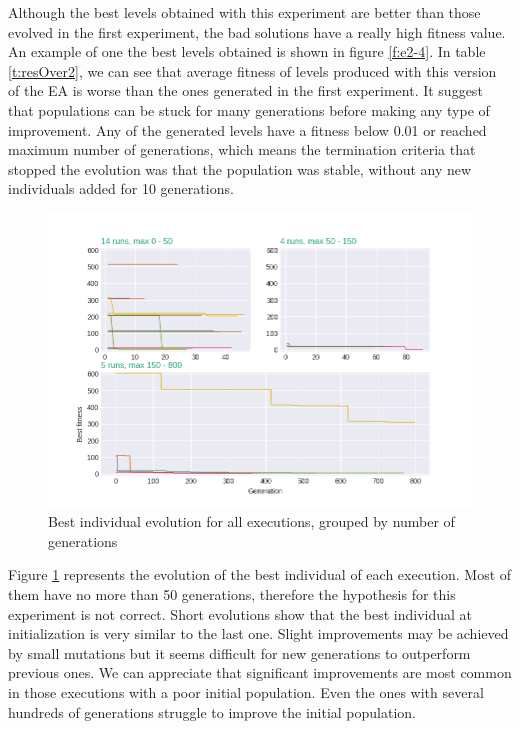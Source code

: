 \documentclass[sigconf]{acmart}
\begin{document}
Although the best levels obtained with this experiment are better than those 
evolved in the first experiment, the bad solutions have a really high fitness 
value. An example of one the best levels obtained is shown in figure 
\ref{f:e2-4}.
In table \ref{t:resOver2}, we can see that average fitness of levels 
produced with this version of the EA is worse than the ones generated in the 
first experiment. It suggest that populations can be stuck for many generations 
before making any type of improvement. Any of the generated levels have a 
fitness below 0.01 or reached maximum number of generations, which means the 
termination criteria that stopped the evolution was that the population was 
stable, without any new individuals added for 10 generations.
\begin{figure}[H]
	\centering
	\includegraphics[scale=0.4]{exp2_explication.png}
	\caption{Best individual evolution for all executions, grouped by number of 
	generations}\label{f:grahp2}
\end{figure}
Figure \ref{f:grahp2} represents the evolution of the best individual of each 
execution. Most of them have no more than 50 generations, therefore the 
hypothesis for this experiment is not correct. Short evolutions show that the 
best individual at initialization is very similar to the last one. Slight 
improvements may be achieved by small mutations but it seems difficult for new 
generations to outperform previous ones. We can appreciate that significant 
improvements are most common in those executions with a poor initial 
population. Even the ones with several hundreds of generations struggle to 
improve the initial population.
\end{document}

